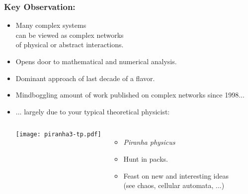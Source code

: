 \begin{frame}
  \frametitle{Key Observation:}

  \begin{block}{}
  \begin{itemize}
  \item <1->
    Many \alert{complex systems}\\ 
    can be viewed as \alert{complex networks}\\
    of physical or abstract interactions.
  \item <2->
    Opens door to mathematical and numerical analysis.
  \item <3-> 
    Dominant approach of last decade of 
    a  flavor.
  \item <4-> 
    Mindboggling amount of work published 
    on complex networks since 1998...
  \item <5-> 
    ... largely due to your typical theoretical physicist:
    \begin{overprint}
      \smallskip
      \begin{columns}
        \texttt{[image: piranha3-tp.pdf]}
        \begin{itemize}
        \item \textit{Piranha physicus}
        \item<7-> Hunt in packs.
        \item<8-> Feast on new and interesting ideas \\
          {\small (see chaos, cellular automata, ...)}
        \end{itemize}
      \end{columns}
    \end{overprint}
  \end{itemize}
    
  \end{block}
\end{frame}


